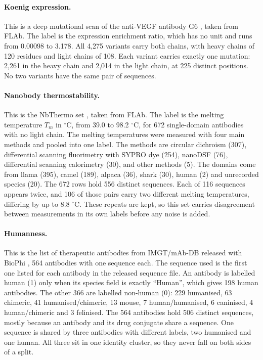 \paragraph{Koenig expression.} This is a deep mutational scan of the anti-VEGF antibody G6 \citep{Koenig2017}, taken from FLAb. The label is the expression enrichment ratio, which has no unit and runs from 0.00098 to 3.178. All 4,275 variants carry both chains, with heavy chains of 120 residues and light chains of 108. Each variant carries exactly one mutation: 2,261 in the heavy chain and 2,014 in the light chain, at 225 distinct positions. No two variants have the same pair of sequences.

\paragraph{Nanobody thermostability.} This is the NbThermo set \citep{ValdesTresanco2023}, taken from FLAb. The label is the melting temperature $T_m$ in $^\circ$C, from 39.0 to 98.2 $^\circ$C, for 672 single-domain antibodies with no light chain. The melting temperatures were measured with four main methods and pooled into one label. The methods are circular dichroism (307), differential scanning fluorimetry with SYPRO dye (254), nanoDSF (76), differential scanning calorimetry (30), and other methods (5). The domains come from llama (395), camel (189), alpaca (36), shark (30), human (2) and unrecorded species (20). The 672 rows hold 556 distinct sequences. Each of 116 sequences appears twice, and 106 of those pairs carry two different melting temperatures, differing by up to 8.8 $^\circ$C. These repeats are kept, so this set carries disagreement between measurements in its own labels before any noise is added.

\paragraph{Humanness.} This is the list of therapeutic antibodies from IMGT/mAb-DB released with BioPhi \citep{Prihoda2022}, 564 antibodies with one sequence each. The sequence used is the first one listed for each antibody in the released sequence file. An antibody is labelled human (1) only when its species field is exactly ``Human'', which gives 198 human antibodies. The other 366 are labelled non-human (0): 229 humanised, 63 chimeric, 41 humanised/chimeric, 13 mouse, 7 human/humanised, 6 caninised, 4 human/chimeric and 3 felinised. The 564 antibodies hold 506 distinct sequences, mostly because an antibody and its drug conjugate share a sequence. One sequence is shared by three antibodies with different labels, two humanised and one human. All three sit in one identity cluster, so they never fall on both sides of a split.

